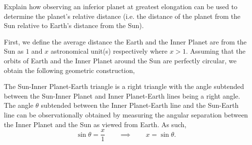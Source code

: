 \documentclass[main.tex]{subfiles}
\begin{document}
\begin{q}{1}
Explain how observing an inferior planet at greatest elongation can be used to
determine the planet's relative distance (i.e. the distance of the planet from
the Sun relative to Earth's distance from the Sun).
\end{q}

\begin{sol}
First, we define the average distance the Earth and the Inner Planet are from
the Sun as $1$ and $x$ astronomical unit(s) respectively where $x > 1$. Assuming
that the orbits of Earth and the Inner Planet around the Sun are perfectly
circular, we obtain the following geometric construction,
\begin{figure}[h!]
    \centering
    
\end{figure}

\noindent The Sun-Inner Planet-Earth triangle is a right triangle with the angle
subtended between the Sun-Inner Planet and Inner Planet-Earth lines being a
right angle. The angle $\theta$ subtended between the Inner Planet-Earth line
and the Sun-Earth line can be observationally obtained by measuring the angular
separation between the Inner Planet and the Sun as viewed from Earth. As such,
\begin{equation}
    \sin\theta = \frac{x}{1}\qquad \implies \qquad x = \sin\theta.
\end{equation}
\end{sol}
\end{document}
